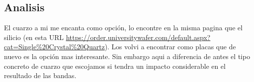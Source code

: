 \subsection*{Analisis}

El cuarzo a mi me encanta como opción, lo encontre en la misma pagina que el silicio (en esta URL \url{https://order.universitywafer.com/default.aspx?cat=Single\%20Crystal\%20Quartz}). Los volvi a encontrar como placas que de nuevo es la opción mas interesante. Sin embargo aqui a diferencia de antes el tipo concreto de cuarzo que escojamos si tendra un impacto considerable en el resultado de las bandas.

\clearpage
